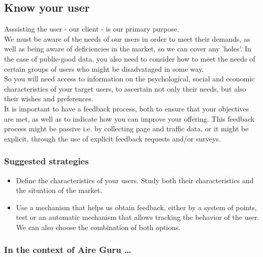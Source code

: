 \subsection{Know your user}

Asssisting the user - our client - is our primary purpose. \\

We must be aware of the needs of our users in order to meet their demands, as well as being aware of deficiencies in the market, so we can cover any 'holes'.
In the case of public-good data, you also need to consider how to meet the needs of certain groups of users who might be disadvataged in some way.\\


So you will need access to information on the psychological, social and economic characteristics of your target users, to ascertain not only
their needs, but also their wishes and preferences.\\

It is important to have a feedback process, both to ensure that your objectives are met, as well as to indicate how you can improve your offering.
This feedback process might be passive i.e. by collecting page and traffic data, or it might be explicit, through the use of explicit feedback requests
and/or surveys.\\

\subsubsection*{Suggested strategies} 

\begin{itemize}
    \item Define the characteristics of your users. Study both their characteristics and the situation of the
    market.
    \item Use a mechanism that helps us obtain feedback, either by a system of points, test or
    an automatic mechanism that allows tracking the behavior of the user. We can also choose the combination of both
    options.
\end{itemize}

\subsubsection*{In the context of Aire Guru \ldots}

